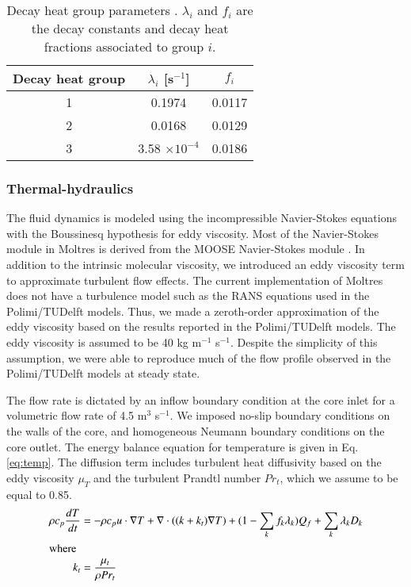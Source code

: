\begin{table}[htb!]
	\centering
	\caption{Decay heat group parameters \cite{fiorina_modelling_2014}.
	$\lambda_i$ and $f_i$ are the decay constants and decay heat fractions
	associated to group $i$.}
	\begin{tabular}{S S S}
		\hline
		{Decay heat group} & {$\lambda_i$ [s$^{-1}$]} & {$f_i$} \\
		 & 0.1974 & 0.0117 \\
		2 & 0.0168 & 0.0129 \\
		3 & 3.58 $\times 10^{-4}$ & 0.0186 \\
		\hline
	\end{tabular}
	\label{table:decay}
\end{table}

\subsubsection{Thermal-hydraulics}

The fluid dynamics is modeled using the incompressible Navier-Stokes
equations with the Boussinesq hypothesis for eddy viscosity. Most of the
Navier-Stokes module in Moltres is derived from the MOOSE Navier-Stokes module
\cite{peterson_overview_2017}. In addition to the intrinsic molecular
viscosity, we introduced an eddy viscosity term to approximate turbulent flow
effects. The current implementation of Moltres does not have a turbulence
model such as the \gls{RANS} equations used in the Polimi/TUDelft models.
Thus, we made a zeroth-order approximation of the eddy viscosity based on the
results reported in the Polimi/TUDelft models. The eddy viscosity is assumed
to be 40 kg m$^{-1}$ s$^{-1}$. Despite the simplicity of this assumption, we
were able to reproduce much of the flow profile observed in the Polimi/TUDelft
models at steady state.

The flow rate is dictated by an inflow boundary condition at the core inlet
for a volumetric flow rate of 4.5 m$^3$ s$^{-1}$. We imposed no-slip boundary
conditions on the walls of the core, and homogeneous Neumann boundary
conditions on the core outlet. The energy balance equation for temperature is
given in Eq. \ref{eq:temp}. The diffusion term includes turbulent heat
diffusivity based on the eddy viscosity $\mu_T$ and the turbulent Prandtl
number $Pr_t$, which we assume to be equal to 0.85. 
%
\begin{align}
	\rho c_p \frac{dT}{dt} &= - \rho c_p u \cdot \nabla T + \nabla \cdot ((k +
	k_t) \nabla T) + (1 - \sum_k f_k \lambda_k) Q_f + \sum_k \lambda_k D_k
	\label{eq:temp} \\
	\intertext{where}
	k_t &= \frac{\mu_t}{\rho Pr_t}
\end{align}

